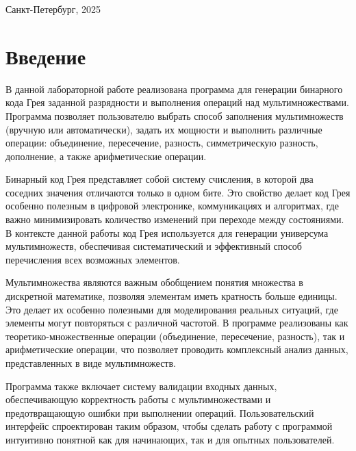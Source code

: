 \documentclass[12pt,a4paper]{article}
\begin{document}
	\hfill \break
	\hfill \break
	\begin{center} \small{Санкт-Петербург, 2025} \end{center}
	\thispagestyle{empty} %

\tableofcontents
\newpage

\section*{Введение}

В данной лабораторной работе реализована программа для генерации бинарного кода Грея заданной разрядности и выполнения операций над мультимножествами. Программа позволяет пользователю выбрать способ заполнения мультимножеств (вручную или автоматически), задать их мощности и выполнить различные операции: объединение, пересечение, разность, симметрическую разность, дополнение, а также арифметические операции.

Бинарный код Грея представляет собой систему счисления, в которой два соседних значения отличаются только в одном бите. Это свойство делает код Грея особенно полезным в цифровой электронике, коммуникациях и алгоритмах, где важно минимизировать количество изменений при переходе между состояниями. В контексте данной работы код Грея используется для генерации универсума мультимножеств, обеспечивая систематический и эффективный способ перечисления всех возможных элементов.

Мультимножества являются важным обобщением понятия множества в дискретной математике, позволяя элементам иметь кратность больше единицы. Это делает их особенно полезными для моделирования реальных ситуаций, где элементы могут повторяться с различной частотой. В программе реализованы как теоретико-множественные операции (объединение, пересечение, разность), так и арифметические операции, что позволяет проводить комплексный анализ данных, представленных в виде мультимножеств.

Программа также включает систему валидации входных данных, обеспечивающую корректность работы с мультимножествами и предотвращающую ошибки при выполнении операций. Пользовательский интерфейс спроектирован таким образом, чтобы сделать работу с программой интуитивно понятной как для начинающих, так и для опытных пользователей.
\end{document}
